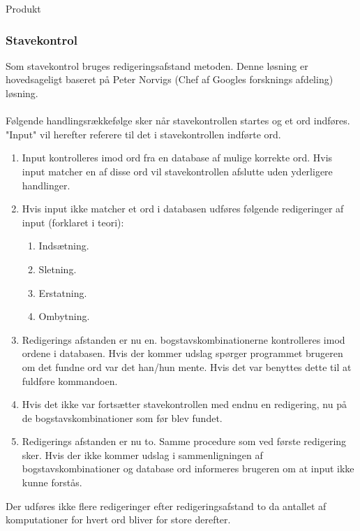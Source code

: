 Produkt















\subsubsection{Stavekontrol} %

Som stavekontrol bruges redigeringsafstand metoden. Denne løsning er hovedsageligt baseret på Peter Norvigs (Chef af Googles forsknings afdeling) løsning.\cite{EditDistance}\\\\

Følgende handlingsrækkefølge sker når stavekontrollen startes og et ord indføres. "Input" vil herefter referere til det i stavekontrollen indførte ord. 

\begin{enumerate}
  \item Input kontrolleres imod ord fra en database af mulige korrekte ord. Hvis input matcher en af disse ord vil stavekontrollen afslutte uden yderligere handlinger.
  \item Hvis input ikke matcher et ord i databasen udføres følgende redigeringer af input (forklaret i teori):
  \begin{enumerate}
    \item Indsætning.
    \item Sletning.
    \item Erstatning.
    \item Ombytning.
  \end{enumerate}
  \item Redigerings afstanden er nu en. bogstavskombinationerne kontrolleres imod ordene i databasen. Hvis der kommer udslag spørger programmet brugeren om det fundne ord var det han/hun mente. Hvis det var benyttes dette til at fuldføre kommandoen.
  \item Hvis det ikke var fortsætter stavekontrollen med endnu en redigering, nu på de bogstavskombinationer som før blev fundet.
  \item Redigerings afstanden er nu to. Samme procedure som ved første redigering sker. Hvis der ikke kommer udslag i sammenligningen af bogstavskombinationer og database ord informeres brugeren om at input ikke kunne forstås.
\end{enumerate}

Der udføres ikke flere redigeringer efter redigeringsafstand to da antallet af komputationer for hvert ord bliver for store derefter.

